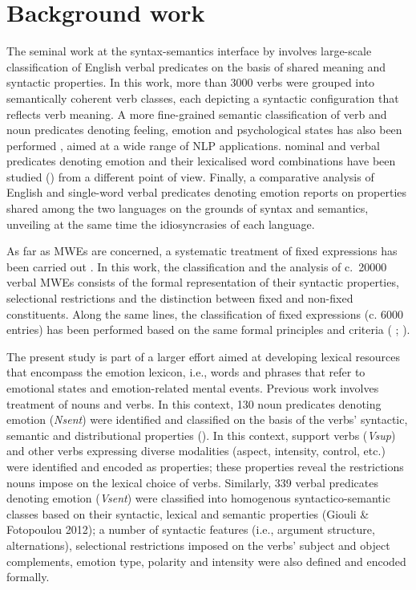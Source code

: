 \documentclass[output=paper]{langsci/langscibook}
\begin{document}
\section{Background work}



The seminal work at the syntax-semantics interface by \citet{levin1993} involves large-scale
classification of English verbal predicates on the basis
of shared meaning and syntactic properties. In this work, more than
3000 verbs were grouped into semantically coherent verb classes, each
depicting a syntactic configuration that reflects verb meaning. A more
fine-grained semantic classification of  verb and noun predicates
denoting feeling, emotion and psychological states has also been
performed \citep{Mathieu1999,Mathieu2005}, aimed at a wide range of NLP
applications.  nominal and verbal
predicates denoting emotion and their lexicalised word combinations
have been studied (\citealt{leeman1991,gross1995locale,balibar1995,tutin2006})  from a different point of view. Finally, a comparative analysis of English and 
single-word verbal predicates denoting emotion \citep{mathieu2010} reports on properties shared among the two languages on the
grounds of syntax and semantics, unveiling at the same time the
idiosyncrasies of each language. 



As far as MWEs are concerned, a systematic treatment of  fixed
expressions has been carried out \citep{gross1982}.  In this work, the
classification and the analysis of c.\ 20000  verbal MWEs consists of
the formal representation of their syntactic properties, selectional
restrictions and the distinction between fixed and non-fixed
constituents. Along the same lines, the classification of  fixed
expressions (c. 6000 entries) has been performed based on the
same formal principles and criteria (\citeauthor{fotopoulou1993} \citeyear*{fotopoulou1993}; \citealt{Mini2009}).



The present study is part of a larger effort aimed at developing lexical
resources that encompass the  emotion lexicon, i.e., words and
phrases that refer to emotional states and emotion-related mental
events. Previous work involves treatment of nouns and verbs. In this
context, 130  noun predicates denoting emotion (\textit{Nsent}) were
identified and classified on the basis of the verbs' syntactic, semantic and
distributional properties (\citealt{pantazara2008,fotopoulou2009}). In this context, support verbs (\textit{Vsup}) and other verbs
expressing diverse modalities (aspect, intensity, control, etc.) were
identified and encoded as properties; these properties reveal the
restrictions nouns impose on the lexical choice of verbs. Similarly,
339  verbal predicates denoting emotion (\textit{Vsent}) were
classified into homogenous syntactico-semantic classes based on their
syntactic, lexical and semantic properties (Giouli \& Fotopoulou 2012);
a number of syntactic features (i.e., argument structure,
alternations), selectional restrictions imposed on the verbs' subject and
object complements, emotion type, polarity and intensity were also
defined and encoded formally. 
\end{document}
